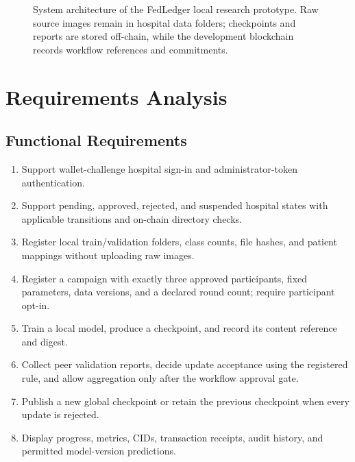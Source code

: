 \documentclass[12pt,a4paper]{report}
\begin{document}
\begin{figure}[htbp]
\doublespacing
\caption{System architecture of the FedLedger local research prototype. Raw source images remain in hospital data folders; checkpoints and reports are stored off-chain, while the development blockchain records workflow references and commitments.}
\label{fig:architecture}
\end{figure}

\section{Requirements Analysis}
\subsection{Functional Requirements}
\begin{enumerate}
    \item Support wallet-challenge hospital sign-in and administrator-token authentication.
    \item Support pending, approved, rejected, and suspended hospital states with applicable transitions and on-chain directory checks.
    \item Register local train/validation folders, class counts, file hashes, and patient mappings without uploading raw images.
    \item Register a campaign with exactly three approved participants, fixed parameters, data versions, and a declared round count; require participant opt-in.
    \item Train a local model, produce a checkpoint, and record its content reference and digest.
    \item Collect peer validation reports, decide update acceptance using the registered rule, and allow aggregation only after the workflow approval gate.
    \item Publish a new global checkpoint or retain the previous checkpoint when every update is rejected.
    \item Display progress, metrics, CIDs, transaction receipts, audit history, and permitted model-version predictions.
\end{enumerate}
\end{document}

